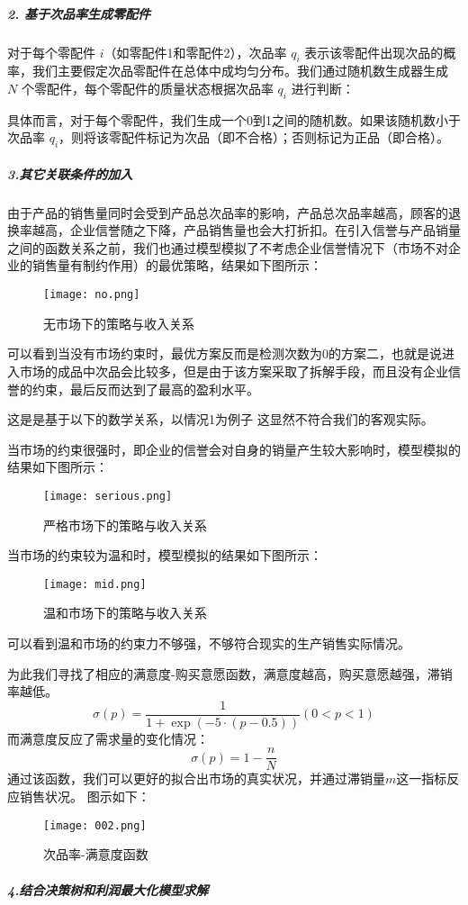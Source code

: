 \documentclass[utf8]{ctexart} %
\begin{document}
		\subparagraph{2. 基于次品率生成零配件}
		
		对于每个零配件 $i$（如零配件1和零配件2），次品率 $q_i$ 表示该零配件出现次品的概率，我们主要假定次品零配件在总体中成均匀分布。我们通过随机数生成器生成 $N$ 个零配件，每个零配件的质量状态根据次品率 $q_i$ 进行判断：
		
		具体而言，对于每个零配件，我们生成一个0到1之间的随机数。如果该随机数小于次品率 $q_i$，则将该零配件标记为次品（即不合格）；否则标记为正品（即合格）。
		\subparagraph{3.其它关联条件的加入}
		由于产品的销售量同时会受到产品总次品率的影响，产品总次品率越高，顾客的退换率越高，企业信誉随之下降，产品销售量也会大打折扣。在引入信誉与产品销量之间的函数关系之前，我们也通过模型模拟了不考虑企业信誉情况下（市场不对企业的销售量有制约作用）的最优策略，结果如下图所示：
		
		\begin{figure}[H] %
			\centering
			\texttt{[image: no.png]}
			\caption{无市场下的策略与收入关系}
			\label{fig:label}
		\end{figure}
		
		可以看到当没有市场约束时，最优方案反而是检测次数为0的方案二，也就是说进入市场的成品中次品会比较多，但是由于该方案采取了拆解手段，而且没有企业信誉的约束，最后反而达到了最高的盈利水平。
		
		这是是基于以下的数学关系，以情况1为例子
		这显然不符合我们的客观实际。
		
		当市场的约束很强时，即企业的信誉会对自身的销量产生较大影响时，模型模拟的结果如下图所示：
		
		\begin{figure}[H] %
			\centering
			\texttt{[image: serious.png]}
			\caption{严格市场下的策略与收入关系}
			\label{fig:label}
		\end{figure}
	
		当市场的约束较为温和时，模型模拟的结果如下图所示：
		
		\begin{figure}[H] %
			\centering
			\texttt{[image: mid.png]}
			\caption{温和市场下的策略与收入关系}
			\label{fig:label}
		\end{figure}
	
		可以看到温和市场的约束力不够强，不够符合现实的生产销售实际情况。
		
		为此我们寻找了相应的满意度-购买意愿函数，满意度越高，购买意愿越强，滞销率越低。
		\[
		\sigma(p) = \frac{1}{1 + \exp(-5 \cdot (p - 0.5))}(0<p<1)
		\]
		而满意度反应了需求量的变化情况：
		\[
		\sigma(p) = 1-\frac{n}{N}
		\]
		通过该函数，我们可以更好的拟合出市场的真实状况，并通过滞销量$m$这一指标反应销售状况。
		图示如下：
			\begin{figure}[H] %
				\centering
				\texttt{[image: 002.png]}
				\caption{次品率-满意度函数}
				\label{fig:label}
			\end{figure}
		\subparagraph{4.结合决策树和利润最大化模型求解}
		
\end{document}
